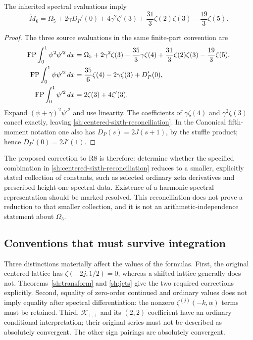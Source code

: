 \begin{proposition}
\label{audit:sixth}
The inherited spectral evaluations imply
\begin{equation}\label{sh:centered-sixth-reconciliation}
 \boxed{\widetilde M_6
   =\Omega_5+2\gamma D_P'(0)+4\gamma^2\zeta'(3)
      +\frac{31}{3}\zeta(2)\zeta(3)-\frac{19}{3}\zeta(5).}
\end{equation}
\end{proposition}
\begin{proof}
The three source evaluations in the same finite-part convention are
\begin{align*}
 \operatorname{FP}\int_0^1\psi^2\psi'^2\,dx
 &=\Omega_5+2\gamma^2\zeta(3)-\frac{35}{3}\gamma\zeta(4)
       +\frac{31}{3}\zeta(2)\zeta(3)-\frac{19}{3}\zeta(5),\\
 \operatorname{FP}\int_0^1\psi\psi'^2\,dx
 &=\frac{35}{6}\zeta(4)-2\gamma\zeta(3)+D_P'(0),\\
 \operatorname{FP}\int_0^1\psi'^2\,dx
 &=2\zeta(3)+4\zeta'(3).
\end{align*}
Expand $(\psi+\gamma)^2\psi'^2$ and use linearity. The coefficients
of $\gamma\zeta(4)$ and $\gamma^2\zeta(3)$ cancel exactly, leaving
\eqref{sh:centered-sixth-reconciliation}. In the Canonical fifth-moment
notation one also has $D_P(s)=2J(s+1)$, by the stuffle product; hence
$D_P'(0)=2J'(1)$.
\end{proof}

The proposed correction to R8 is therefore: determine whether the
specified combination in \eqref{sh:centered-sixth-reconciliation}
reduces to a smaller, explicitly stated collection of constants, such
as selected ordinary zeta derivatives and prescribed height-one
spectral data. Existence of a harmonic-spectral representation should
be marked resolved. This reconciliation does not prove a reduction
to that smaller collection, and it is not an arithmetic-independence
statement about $\Omega_5$.

\subsection{Conventions that must survive integration}

Three distinctions materially affect the values of the formulas.
First, the original centered lattice has
$\zeta(-2j,1/2)=0$, whereas a shifted lattice generally does not.
Theorems~\ref{sh:transform} and \ref{sh:jets} give the two required
corrections explicitly. Second, equality of zero-order continued and
ordinary values does not imply equality after spectral differentiation:
the nonzero $\zeta^{(j)}(-k,\alpha)$ terms must be retained. Third,
$\mathcal K_{+,+}$ and its $(2,2)$ coefficient have an ordinary
conditional interpretation; their original series must not be
described as absolutely convergent. The other sign pairings are
absolutely convergent.

